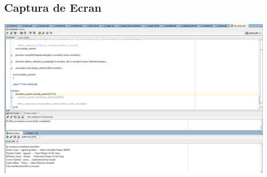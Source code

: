 \documentclass{article}
\begin{document}
\subsection{Captura de Ecran}
\includegraphics[width=40em, keepaspectratio]{flux-actiuni}
\pagebreak
\end{document}
